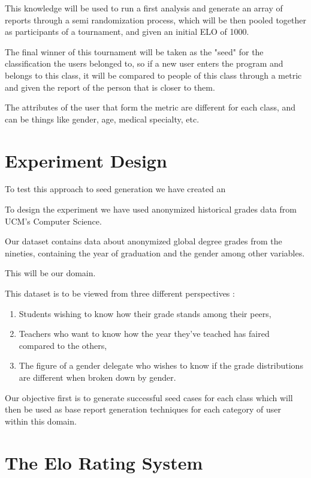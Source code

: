 This knowledge will be used to run a first analysis and generate an array of reports through a semi randomization process, 
which will be then pooled together as participants of a tournament, and given an initial ELO of 1000.

The final winner of this tournament will be taken as the "seed" for the classification the users belonged to, 
so if a new user enters the program and belongs to this class, it will be compared to people of this class through a metric and given the report of the person that is closer to them.

The attributes of the user that form the metric are different for each class, and can be things like gender, age, medical specialty, etc.
\section{Experiment Design}
\label{cap4:sec:experimentdesign}
To test this approach to seed generation we have created an

To design the experiment we have used anonymized historical grades data from UCM's Computer Science.

Our dataset contains data about anonymized global degree grades from the nineties, containing the year of graduation and the gender among other variables.

This will be our domain.

This dataset is to be viewed from three different perspectives : 
\begin{enumerate}
\item Students wishing to know how their grade stands among their peers, 
\item Teachers who want to know how the year they've teached has faired compared to the others, 
\item The figure of a gender delegate who wishes to know if the grade distributions are different when broken down by gender.
\end{enumerate}

Our objective first is to generate successful seed cases for each class which will then be used as base report generation techniques for each category of user within this domain. 
\section{The Elo Rating System}
\label{cap4:sec:elorating}

